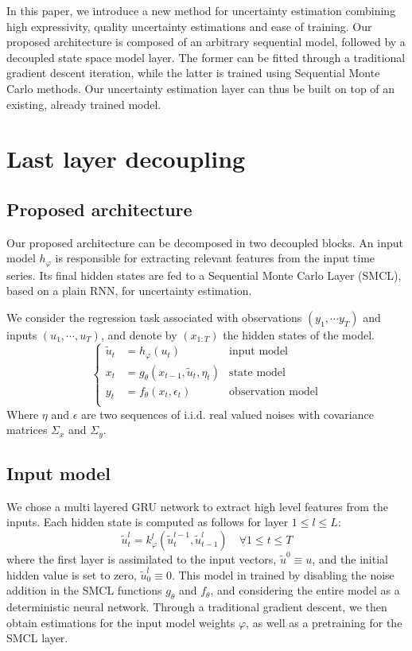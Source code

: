 \documentclass{article}
\begin{document}
In this paper, we introduce a new method for uncertainty estimation combining high expressivity, quality uncertainty estimations and ease of training.
Our proposed architecture is composed of an arbitrary sequential model, followed by a decoupled state space model layer.
The former can be fitted through a traditional gradient descent iteration, while the latter is trained using Sequential Monte Carlo methods.
Our uncertainty estimation layer can thus be built on top of an existing, already trained model.

\section{Last layer decoupling}
\label{sec:decoupling}

\subsection{Proposed architecture}%
\label{sub:proposed_architecture}

Our proposed architecture can be decomposed in two decoupled blocks.
An input model $h_\varphi$ is responsible for extracting relevant features from the input time series.
Its final hidden states are fed to a Sequential Monte Carlo Layer (SMCL), based on a plain RNN, for uncertainty estimation.

We consider the regression task associated with observations $(y_1, \cdots y_T)$ and inputs $(u_1, \cdots, u_T)$, and denote by $(x_{1:T})$ the hidden states of the model.
\begin{equation*}
	\left\{
	\begin{aligned}
		\tilde u_t & = h_\varphi(u_t)                        & \text{input model}       \\
		x_t        & = g_\theta(x_{t-1}, \tilde u_t, \eta_t) & \text{state model}       \\
		y_t        & = f_\theta(x_t, \epsilon_t)             & \text{observation model} \\
	\end{aligned}
	\right.
\end{equation*}
Where $\eta$ and $\epsilon$ are two sequences of i.i.d. real valued noises with covariance matrices $\Sigma_x$ and $\Sigma_y$.

\subsection{Input model}%
\label{sub:input_model}
We chose a multi layered GRU network to extract high level features from the inputs.
Each hidden state is computed as follows for layer $1 \leq l \leq L$:
$$
	\tilde u^l_t = k_\varphi^l(\tilde u^{l-1}_t, \tilde u^l_{t-1}) \quad \forall 1 \leq t \leq T
$$
where the first layer is assimilated to the input vectors, $\tilde u^0 \equiv u$, and the initial hidden value is set to zero, $\tilde u^l_0 \equiv 0$.
This model in trained by disabling the noise addition in the SMCL functions $g_\theta$ and $f_\theta$, and considering the entire model as a deterministic neural network.
Through a traditional gradient descent, we then obtain estimations for the input model weights $\varphi$, as well as a pretraining for the SMCL layer.
\end{document}
